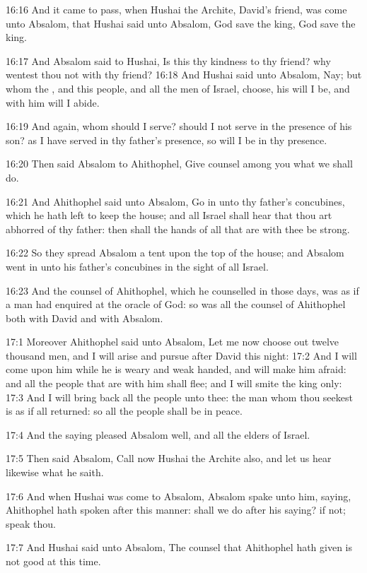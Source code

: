 16:16 And it came to pass, when Hushai the Archite, David's friend, was come unto Absalom, that Hushai said unto Absalom, God save the king, God save the king.

16:17 And Absalom said to Hushai, Is this thy kindness to thy friend?  why wentest thou not with thy friend?  16:18 And Hushai said unto Absalom, Nay; but whom the \LORD, and this people, and all the men of Israel, choose, his will I be, and with him will I abide.

16:19 And again, whom should I serve? should I not serve in the presence of his son? as I have served in thy father's presence, so will I be in thy presence.

16:20 Then said Absalom to Ahithophel, Give counsel among you what we shall do.

16:21 And Ahithophel said unto Absalom, Go in unto thy father's concubines, which he hath left to keep the house; and all Israel shall hear that thou art abhorred of thy father: then shall the hands of all that are with thee be strong.

16:22 So they spread Absalom a tent upon the top of the house; and Absalom went in unto his father's concubines in the sight of all Israel.

16:23 And the counsel of Ahithophel, which he counselled in those days, was as if a man had enquired at the oracle of God: so was all the counsel of Ahithophel both with David and with Absalom.

17:1 Moreover Ahithophel said unto Absalom, Let me now choose out twelve thousand men, and I will arise and pursue after David this night: 17:2 And I will come upon him while he is weary and weak handed, and will make him afraid: and all the people that are with him shall flee; and I will smite the king only: 17:3 And I will bring back all the people unto thee: the man whom thou seekest is as if all returned: so all the people shall be in peace.

17:4 And the saying pleased Absalom well, and all the elders of Israel.

17:5 Then said Absalom, Call now Hushai the Archite also, and let us hear likewise what he saith.

17:6 And when Hushai was come to Absalom, Absalom spake unto him, saying, Ahithophel hath spoken after this manner: shall we do after his saying? if not; speak thou.

17:7 And Hushai said unto Absalom, The counsel that Ahithophel hath given is not good at this time.


